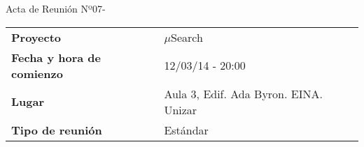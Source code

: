 \begin{center}	
\Large{Acta de Reunión Nº07\hspace{0.25em}-\hspace{0.25em}\tituloReunion}
\end{center}
\vspace{1.5em}

\begin{longtable}{ | L{\tabcolsep} |
				     L{\tabcolsep} | }
\hline %
  \\
\hline %
{\bf Proyecto} & $\mu$Search \\ 
\hline %
{\bf Fecha y hora de comienzo} & 12/03/14 - 20:00 \\
\hline %
{\bf Lugar} & Aula 3, Edif. Ada Byron. EINA. Unizar \\
\hline %
{\bf Tipo de reunión} & Estándar \\
\hline %
\end{longtable}


